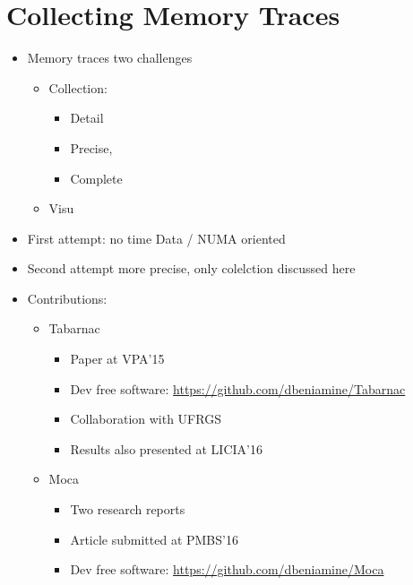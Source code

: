 \chapter{Collecting Memory Traces}

\begin{itemize}
    \item Memory traces two challenges
        \begin{itemize}
            \item Collection:
                \begin{itemize}
                    \item Detail
                    \item Precise,
                    \item Complete
                \end{itemize}
            \item Visu
        \end{itemize}
    \item First attempt: no time Data / NUMA oriented
    \item Second attempt more precise, only colelction discussed here
    \item Contributions:
        \begin{itemize}
            \item \gls{Tabarnac}
                \begin{itemize}
                    \item Paper at VPA'15~\cite{Beniamine15TABARNAC}
                    \item Dev free software: \url{https://github.com/dbeniamine/Tabarnac}
                    \item Collaboration with UFRGS
                    \item Results also presented at LICIA'16
                \end{itemize}
            \item \gls{Moca}
                \begin{itemize}
                    \item Two research reports~\cite{Beniamine15Memory,Beniamine16Moca}
                    \item Article submitted at PMBS'16
                    \item Dev free software: \url{https://github.com/dbeniamine/Moca}
                \end{itemize}
        \end{itemize}
\end{itemize}



